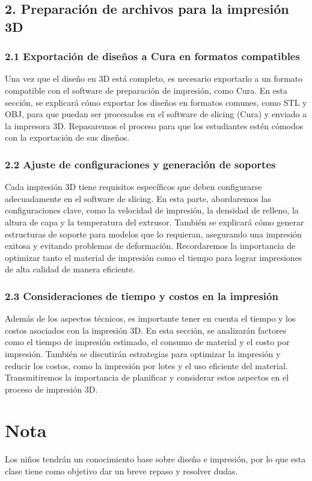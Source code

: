 \documentclass{article}
\begin{document}
\subsection*{2. Preparación de archivos para la impresión 3D}
\subsubsection*{2.1 Exportación de diseños a Cura en formatos compatibles}
Una vez que el diseño en 3D está completo, es necesario exportarlo a un formato compatible con el software de preparación de impresión, como Cura. En esta sección, se explicará cómo exportar los diseños en formatos comunes, como STL y OBJ, para que puedan ser procesados en el software de slicing (Cura) y enviado a la impresora 3D. Repasaremos el proceso para que los estudiantes estén cómodos con la exportación de sus diseños.

\subsubsection*{2.2 Ajuste de configuraciones y generación de soportes}
Cada impresión 3D tiene requisitos específicos que deben configurarse adecuadamente en el software de slicing. En esta parte, abordaremos las configuraciones clave, como la velocidad de impresión, la densidad de relleno, la altura de capa y la temperatura del extrusor. También se explicará cómo generar estructuras de soporte para modelos que lo requieran, asegurando una impresión exitosa y evitando problemas de deformación. Recordaremos la importancia de optimizar tanto el material de impresión como el tiempo para lograr impresiones de alta calidad de manera eficiente.

\subsubsection*{2.3 Consideraciones de tiempo y costos en la impresión}
Además de los aspectos técnicos, es importante tener en cuenta el tiempo y los costos asociados con la impresión 3D. En esta sección, se analizarán factores como el tiempo de impresión estimado, el consumo de material y el costo por impresión. También se discutirán estrategias para optimizar la impresión y reducir los costos, como la impresión por lotes y el uso eficiente del material. Transmitiremos la importancia de planificar y considerar estos aspectos en el proceso de impresión 3D.

\section*{Nota}
Los niños tendrán un conocimiento base sobre diseño e impresión, por lo que esta clase tiene como objetivo dar un breve repaso y resolver dudas.
\end{document}

